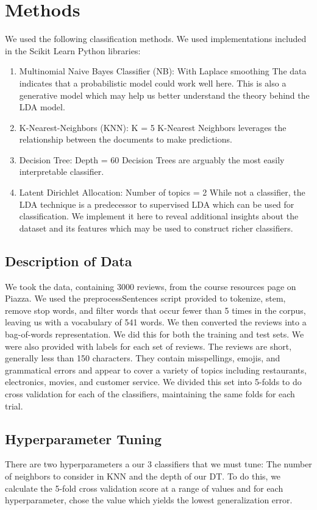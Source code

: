 \documentclass{article} %
\begin{document}
\section{Methods}
We used the following classification methods. We used implementations included in the Scikit Learn Python libraries: 
\begin{enumerate}
	\item Multinomial Naive Bayes Classifier (NB): With Laplace smoothing \newline
	The data indicates that a probabilistic model could work well here. This is also a generative model which may help us better understand the theory behind the LDA model. 
	\item K-Nearest-Neighbors (KNN): K = 5 \newline
	K-Nearest Neighbors leverages the relationship between the documents to make predictions.
	\item Decision Tree: Depth = 60
	Decision Trees are arguably the most easily interpretable classifier. 
	\item Latent Dirichlet Allocation: Number of topics = 2 \newline
	While not a classifier, the LDA technique is a predecessor to supervised LDA which can be used for classification. We implement it here to reveal additional insights about the dataset and its features which may be used to construct richer classifiers.
\end{enumerate}

\subsection{Description of Data}
We took the data, containing 3000 reviews, from the course resources page on Piazza. We used the preprocessSentences script provided to tokenize, stem, remove stop words, and filter words that occur fewer than 5 times in the corpus, leaving us with a vocabulary of 541 words. We then converted the reviews into a bag-of-words representation. We did this for both the training and test sets. We were also provided with labels for each set of reviews. The reviews are short, generally less than 150 characters. They contain misspellings, emojis, and grammatical errors and appear to cover a variety of topics including restaurants, electronics, movies, and customer service. We divided this set into 5-folds to do cross validation for each of the classifiers, maintaining the same folds for each trial.

\subsection{Hyperparameter Tuning}
There are two hyperparameters a our 3 classifiers that we must tune: The number of neighbors to consider in KNN and the depth of our DT. To do this, we calculate the 5-fold cross validation score at a range of values and for each hyperparameter, chose the value which yields the lowest generalization error. 
\end{document}
